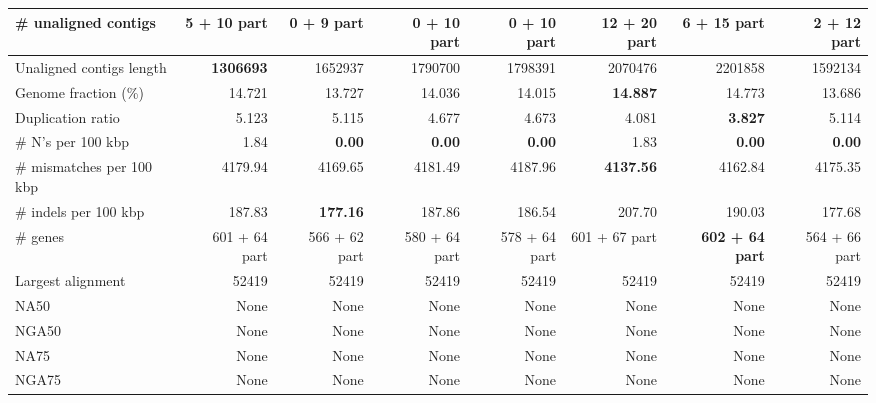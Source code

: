 \documentclass[12pt,a4paper]{article}
\begin{document}
\begin{table}[ht]
\begin{center}
\begin{tabular}{|l*{7}{|r}|}
\# unaligned contigs & 5 + 10 part & {\bf 0 + 9 part} & 0 + 10 part & 0 + 10 part & 12 + 20 part & 6 + 15 part & 2 + 12 part \\ \hline
Unaligned contigs length & {\bf 1306693} & 1652937 & 1790700 & 1798391 & 2070476 & 2201858 & 1592134 \\ \hline
Genome fraction (\%) & 14.721 & 13.727 & 14.036 & 14.015 & {\bf 14.887} & 14.773 & 13.686 \\ \hline
Duplication ratio & 5.123 & 5.115 & 4.677 & 4.673 & 4.081 & {\bf 3.827} & 5.114 \\ \hline
\# N's per 100 kbp & 1.84 & {\bf 0.00} & {\bf 0.00} & {\bf 0.00} & 1.83 & {\bf 0.00} & {\bf 0.00} \\ \hline
\# mismatches per 100 kbp & 4179.94 & 4169.65 & 4181.49 & 4187.96 & {\bf 4137.56} & 4162.84 & 4175.35 \\ \hline
\# indels per 100 kbp & 187.83 & {\bf 177.16} & 187.86 & 186.54 & 207.70 & 190.03 & 177.68 \\ \hline
\# genes & 601 + 64 part & 566 + 62 part & 580 + 64 part & 578 + 64 part & 601 + 67 part & {\bf 602 + 64 part} & 564 + 66 part \\ \hline
Largest alignment & 52419 & 52419 & 52419 & 52419 & 52419 & 52419 & 52419 \\ \hline
NA50 & None & None & None & None & None & None & None \\ \hline
NGA50 & None & None & None & None & None & None & None \\ \hline
NA75 & None & None & None & None & None & None & None \\ \hline
NGA75 & None & None & None & None & None & None & None \\ \hline
\end{tabular}
\end{center}
\end{table}
\end{document}
